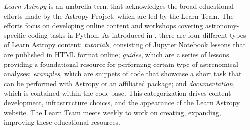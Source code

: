 \documentclass[modern]{aastex631}
\begin{document}
\textit{Learn Astropy} is an umbrella term that acknowledges the broad
educational efforts made by the Astropy Project, which are led by the Learn
Team.
The efforts focus on developing online content and workshops covering
astronomy-specific coding tasks in Python.
As introduced in \citet{astropy:2018}, there are four different types of
Learn Astropy content: \textit{tutorials}, consisting of Jupyter Notebook
lessons that are published in HTML format online; \textit{guides}, which are a
series of lessons providing a foundational resource for performing certain
type of astronomical analyses; \textit{examples}, which are snippets of code
that showcase a short task that can be performed with Astropy or an affiliated
package; and \textit{documentation}, which is contained within the code base.
This categorization drives content development, infrastructure choices, and the
appearance of the Learn Astropy website.
The Learn Team meets weekly to work on creating, expanding, improving these
educational resources.
\end{document}
